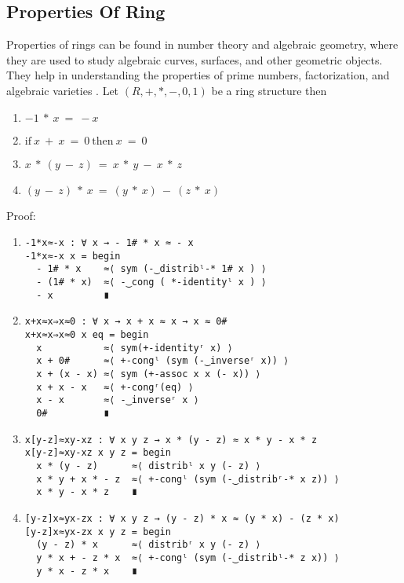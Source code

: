 \subsection{Properties Of Ring}
Properties of rings can be found in number theory and algebraic geometry, where
they are used to study algebraic curves, surfaces, and other geometric objects.
They help in understanding the properties of prime numbers, factorization, and
algebraic varieties \cite{pedrouzo2021revisiting}. Let $(R, +, *, -, 0, 1)$ be a
ring structure then
\begin{enumerate}
\item \(- 1\ *\ x\ =\ -x\)
\item \(\text{if}\ x\ +\ x\ =\ 0\ \text{then}\ x\ =\ 0\)
\item \(x\ *\ (y\ -\ z)\ =\ x\ *\ y\ -\ x\ *\ z\)
\item \((y\ -\ z)\ *\ x\ =\ (y\ *\ x)\ -\ (z\ *\ x)\)
\end{enumerate}
Proof:
\begin{enumerate}
\item
\begin{verbatim}
-1*x≈-x : ∀ x → - 1# * x ≈ - x
-1*x≈-x x = begin
  - 1# * x    ≈⟨ sym (-‿distribˡ-* 1# x ) ⟩
  - (1# * x)  ≈⟨ -‿cong ( *-identityˡ x ) ⟩
  - x         ∎
\end{verbatim}
\item
\begin{verbatim}
x+x≈x⇒x≈0 : ∀ x → x + x ≈ x → x ≈ 0#
x+x≈x⇒x≈0 x eq = begin
  x           ≈⟨ sym(+-identityʳ x) ⟩
  x + 0#      ≈⟨ +-congˡ (sym (-‿inverseʳ x)) ⟩
  x + (x - x) ≈⟨ sym (+-assoc x x (- x)) ⟩
  x + x - x   ≈⟨ +-congʳ(eq) ⟩
  x - x       ≈⟨ -‿inverseʳ x ⟩
  0#          ∎
\end{verbatim}
\item
\begin{verbatim}
x[y-z]≈xy-xz : ∀ x y z → x * (y - z) ≈ x * y - x * z
x[y-z]≈xy-xz x y z = begin
  x * (y - z)      ≈⟨ distribˡ x y (- z) ⟩
  x * y + x * - z  ≈⟨ +-congˡ (sym (-‿distribʳ-* x z)) ⟩
  x * y - x * z    ∎
\end{verbatim}
\item
\begin{verbatim}
[y-z]x≈yx-zx : ∀ x y z → (y - z) * x ≈ (y * x) - (z * x)
[y-z]x≈yx-zx x y z = begin
  (y - z) * x      ≈⟨ distribʳ x y (- z) ⟩
  y * x + - z * x  ≈⟨ +-congˡ (sym (-‿distribˡ-* z x)) ⟩
  y * x - z * x    ∎
\end{verbatim}
\end{enumerate}